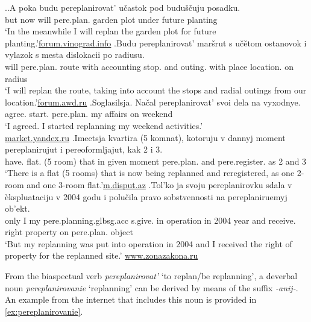 \ex.\label{ex:pereplanirovat:imperf}\ag.\label{ex:pereplanirovat:future1}A poka budu pereplanirovat'\textsuperscript{\IPF} u\v{c}astok pod budu\v{s}\v{c}uju posadku.\\
but now will pere.plan. {garden plot} under future  planting\\
\trans `In the meanwhile I will replan the garden plot for future  planting.'\hbox{}\hfill\hbox{\url{forum.vinograd.info}}
\bg.\label{ex:pereplanirovat:future2}Budu pereplanirovat' mar\v{s}rut s u\v{c}\v{e}tom ostanovok i vylazok s mesta dislokacii po radiusu.\\
will pere.plan. route with accounting stop. and outing. with place location. on radius\\
\trans `I will replan the route, taking into account the stops and radial outings from our location.'\hbox{}\hfill\hbox{\url{forum.awd.ru}}
\bg.\label{ex:pereplanirovat:start}Soglasilsja. Na\v{c}al pereplanirovat' svoi dela na vyxodnye.\\
agree. start. pere.plan. my affairs on weekend\\
\trans `I agreed. I started replanning my weekend activities.'\\\hbox{}\hfill\hbox{\url{market.yandex.ru}}
\bg.\label{ex:pereplanirovat:prog}Imeetsja kvartira (5 komnat), kotoruju v dannyj moment pereplanirujut i pereoformljajut, kak 2 i 3.\\
have. flat. (5 room) that in given moment pere.plan. and pere.register. as 2 and 3\\
\trans `There is a flat (5 rooms) that is now being replanned and reregistered, as one 2-room and one 3-room flat.'\hbox{}\hfill\hbox{\url{m.disput.az}}
\bg.\label{ex:pereplanirovat:part}Tol'ko ja svoju pereplanirovku sdala v \`{e}kspluataciju v 2004 godu i polu\v{c}ila pravo sobstvennosti na pereplaniruemyj ob'ekt.\\
only I my pere.planning.glb{sg.acc} s.give. in operation in 2004 year and receive. right property on pere.plan. object\\
`But my replanning was put into operation in 2004 and I received the right of property for the replanned site.'
\hbox{}\hfill\hbox{\url{www.zonazakona.ru}}

From the biaspectual verb  \textit{pereplanirovat'} `to replan/be replanning', a deverbal noun \textit{pereplanirovanie} `replanning' can be derived by means of the suffix \textit{-anij-}. An example from the internet that includes this noun is provided in \ref{ex:pereplanirovanie}.

